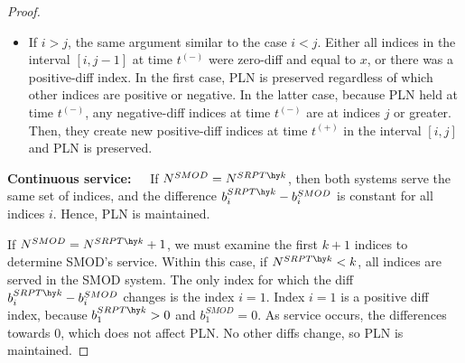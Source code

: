 \documentclass[acmsmall]{acmart}
\begin{document}
\begin{proof}
\begin{itemize}
    Note that the only diffs that are affected are indices in the interval $[i, j]$ at time $t^{(+)}$.
    We thus focus on PLN relationships involving these indices. For all $\ell \ge i$, we have $p_\ell \ge x$,
    and for all $m < j$, $q_m \le x$.
    Thus, all indices in the interval $[i, j-1]$ were zero or negative-diff indices at time $t^{(-)}$.
    
    If all such indices were zero-diff, then all of the indices involved must have remaining size exactly $x$:
    $p_i = p_{i+1} = \ldots = p_{j-1} = q_i = \ldots = q_{j-1} = x$.
    In this case, all indices in the interval $[i, j]$ are zero-diff at time $t^{(+)}$, maintaining PLN regardless of which other indices are positive or negative.
    
    Now, we turn to the case where at least one index in the interval $[i, j-1]$ was negative-diff at time $t^{(-)}$.
    Because the PLN property holds at time $t^{(-)}$, all positive-diff indices at time $t^{(-)}$ are below $i$.
    Then, only zero-diff and negative-diff indices are created in the interval $[i, j]$ at time $t^{(+)}$, preserving PLN.

    \item If $i > j$, the same argument similar to the case $i<j$. 
    Either all indices in the interval $[i, j-1]$ at time $t^{(-)}$ were zero-diff and equal to $x$, or there was a positive-diff index. In the first case, PLN is preserved regardless of which other indices are positive or negative. In the latter case, because PLN held at time $t^{(-)}$, any negative-diff indices at time $t^{(-)}$ are at indices $j$ or greater. Then, they create new positive-diff indices at time $t^{(+)}$ in the interval $[i, j]$ and PLN is preserved.
    \end{itemize}
    
    \textbf{Continuous service:~~} If $N^{SMOD} = N^{SRPT\hy k}$, then both systems serve the same set of indices, and the difference $b^{SRPT\hy k}_i - b^{SMOD}_i$ is constant for all indices $i$. Hence, PLN is maintained.

    If $N^{SMOD} = N^{SRPT\hy k} + 1$, we must examine the first $k+1$ indices to determine SMOD's service.
    Within this case, if $N^{SRPT\hy k} < k$, all indices are served in the SMOD system. The only index for which the diff $b^{SRPT\hy k}_i - b^{SMOD}_i$ changes is the index $i=1$.
    Index $i=1$ is a positive diff index, because $b^{SRPT\hy k}_1 > 0$ and $b^{SMOD}_1 = 0$.
    As service occurs, the differences towards 0, which does not affect PLN.
    No other diffs change, so PLN is maintained.
    

\end{proof}
\end{document}
